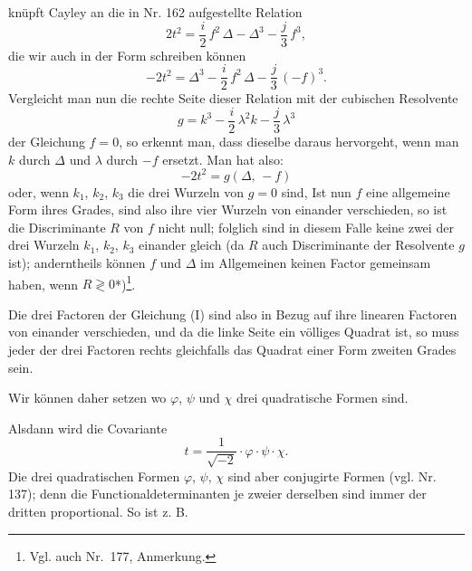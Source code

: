 knüpft Cayley an die in Nr. 162 aufgestellte Relation
\[
2t^2 = \frac{i}{2}\, f^2\, \Delta - \Delta^3 - \frac{j}{3}\, f^3,
\]
die wir auch in der Form schreiben können
\[
-2t^2 = \Delta^3 - \frac{i}{2}\, f^2\, \Delta - \frac{j}{3}\, (-f)^3.
\]
Vergleicht man nun die rechte Seite dieser Relation mit der cubischen Resolvente
\[
g = k^3 - \frac{i}{2}\, \lambda^2 k - \frac{j}{3}\, \lambda^3
\]
der Gleichung $f = 0$, so erkennt man, dass dieselbe daraus hervorgeht, wenn man $k$ durch $\Delta$ und $\lambda$ durch $-f$ ersetzt. Man hat also:
\[
-2t^2 = g(\Delta,\, -f)
\]
oder, wenn $k_1$, $k_2$, $k_3$ die drei Wurzeln von $g=0$ sind,
Ist nun $f$ eine allgemeine Form ihres Grades, sind also ihre vier Wurzeln von einander verschieden, so ist die Discriminante $R$ von $f$ nicht null; folglich sind in diesem Falle keine zwei der drei Wurzeln $k_1$, $k_2$, $k_3$ einander gleich (da $R$ auch Discriminante der Resolvente $g$ ist); anderntheils können $f$ und $\Delta$ im Allgemeinen keinen Factor gemeinsam haben, wenn $R \gtrless 0$*)\footnote{Vgl. auch Nr.~177, Anmerkung.}.

Die drei Factoren der Gleichung (I) sind also in Bezug auf ihre linearen Factoren von einander verschieden, und da die linke Seite ein völliges Quadrat ist, so muss jeder der drei Factoren rechts gleichfalls das Quadrat einer Form zweiten Grades sein.

Wir können daher setzen
wo $\varphi$, $\psi$ und $\chi$ drei quadratische Formen sind.

Alsdann wird die Covariante
\[
t = \frac{1}{\sqrt{-2}} \cdot \varphi \cdot \psi \cdot \chi.
\]
Die drei quadratischen Formen $\varphi$, $\psi$, $\chi$ sind aber conjugirte Formen (vgl. Nr. 137); denn die Functionaldeterminanten je zweier derselben sind immer der dritten proportional. So ist z. B.


